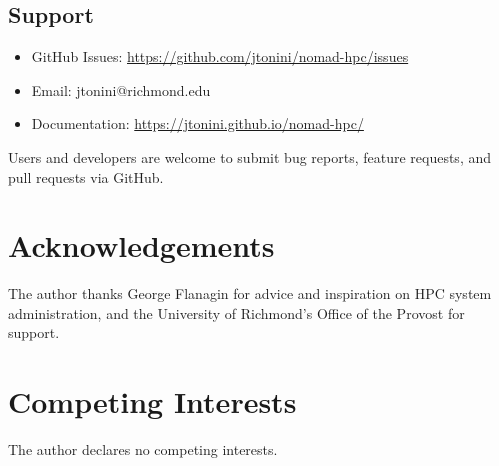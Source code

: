 \documentclass[11pt,a4paper]{article}
\begin{document}
\subsection*{Support}
\begin{itemize}
\item GitHub Issues: \url{https://github.com/jtonini/nomad-hpc/issues}
\item Email: jtonini@richmond.edu
\item Documentation: \url{https://jtonini.github.io/nomad-hpc/}
\end{itemize}

Users and developers are welcome to submit bug reports, feature requests, and pull requests via GitHub.

\section*{Acknowledgements}
The author thanks George Flanagin for advice and inspiration on HPC system administration, and the University of Richmond's Office of the Provost for support.

\section*{Competing Interests}
The author declares no competing interests.
\end{document}
